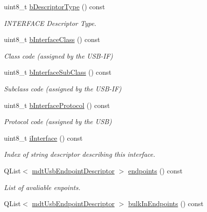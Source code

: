 \begin{DoxyCompactItemize}
uint8\-\_\-t \hyperlink{classmdt_usb_interface_descriptor_a8610aa75199d6e2d8b12cf5bc7f6582d}{b\-Descriptor\-Type} () const 
\begin{DoxyCompactList}\small\item\em I\-N\-T\-E\-R\-F\-A\-C\-E Descriptor Type. \end{DoxyCompactList}\item 
uint8\-\_\-t \hyperlink{classmdt_usb_interface_descriptor_a067ebfa8ed9941d8db481e106bb67bb9}{b\-Interface\-Class} () const 
\begin{DoxyCompactList}\small\item\em Class code (assigned by the U\-S\-B-\/\-I\-F) \end{DoxyCompactList}\item 
uint8\-\_\-t \hyperlink{classmdt_usb_interface_descriptor_afca641ae0c4ec5707f6db30276298ad4}{b\-Interface\-Sub\-Class} () const 
\begin{DoxyCompactList}\small\item\em Subclass code (assigned by the U\-S\-B-\/\-I\-F) \end{DoxyCompactList}\item 
uint8\-\_\-t \hyperlink{classmdt_usb_interface_descriptor_a3fe6a90f6274c05cdfcdcaead002538b}{b\-Interface\-Protocol} () const 
\begin{DoxyCompactList}\small\item\em Protocol code (assigned by the U\-S\-B) \end{DoxyCompactList}\item 
uint8\-\_\-t \hyperlink{classmdt_usb_interface_descriptor_a408510bf9c12aa929a8809a86a4c5bf9}{i\-Interface} () const 
\begin{DoxyCompactList}\small\item\em Index of string descriptor describing this interface. \end{DoxyCompactList}\item 
Q\-List$<$ \hyperlink{classmdt_usb_endpoint_descriptor}{mdt\-Usb\-Endpoint\-Descriptor} $>$ \hyperlink{classmdt_usb_interface_descriptor_ad95199161cdf269c3a75f35421ede44e}{endpoints} () const 
\begin{DoxyCompactList}\small\item\em List of avaliable enpoints. \end{DoxyCompactList}\item 
Q\-List$<$ \hyperlink{classmdt_usb_endpoint_descriptor}{mdt\-Usb\-Endpoint\-Descriptor} $>$ \hyperlink{classmdt_usb_interface_descriptor_a40ee049a37cee4e8911ab779900f6145}{bulk\-In\-Endpoints} () const 

\end{DoxyCompactItemize}
